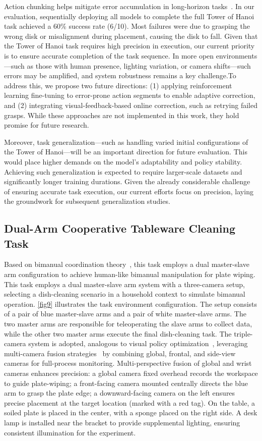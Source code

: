 \documentclass[runningheads]{llncs}
\begin{document}
Action chunking helps mitigate error accumulation in long-horizon tasks~\cite{ref10}. In our evaluation, sequentially deploying all models to complete the full Tower of Hanoi task achieved a 60\% success rate (6/10). Most failures were due to grasping the wrong disk or misalignment during placement, causing the disk to fall. Given that the Tower of Hanoi task requires high precision in execution, our current priority is to ensure accurate completion of the task sequence. In more open environments—such as those with human presence, lighting variation, or camera shifts—such errors may be amplified, and system robustness remains a key challenge.To address this, we propose two future directions: (1) applying reinforcement learning fine-tuning to error-prone action segments to enable adaptive correction, and (2) integrating visual-feedback-based online correction, such as retrying failed grasps. While these approaches are not implemented in this work, they hold promise for future research.

Moreover, task generalization—such as handling varied initial configurations of the Tower of Hanoi—will be an important direction for future evaluation. This would place higher demands on the model’s adaptability and policy stability. Achieving such generalization is expected to require larger-scale datasets and significantly longer training durations. Given the already considerable challenge of ensuring accurate task execution, our current efforts focus on precision, laying the groundwork for subsequent generalization studies.

\subsection{Dual-Arm Cooperative Tableware Cleaning Task}
Based on bimanual coordination theory~\cite{ref11}, this task employs a dual master-slave arm configuration to achieve human-like bimanual manipulation for plate wiping. This task employs a dual master-slave arm system with a three-camera setup, selecting a dish-cleaning scenario in a household context to simulate bimanual operation. \cref{fig9} illustrates the task environment configuration. The setup consists of a pair of blue master-slave arms and a pair of white master-slave arms. The two master arms are responsible for teleoperating the slave arms to collect data, while the other two master arms execute the final dish-cleaning task. The triple-camera system is adopted, analogous to visual policy optimization~\cite{ref12}, leveraging multi-camera fusion strategies~\cite{ref13} by combining global, frontal, and side-view cameras for full-process monitoring. Multi-perspective fusion of global and wrist cameras enhances precision: a global camera fixed overhead records the workspace to guide plate-wiping; a front-facing camera mounted centrally directs the blue arm to grasp the plate edge; a downward-facing camera on the left ensures precise placement at the target location (marked with a red tag). On the table, a soiled plate is placed in the center, with a sponge placed on the right side. A desk lamp is installed near the bracket to provide supplemental lighting, ensuring consistent illumination for the experiment.
\end{document}
